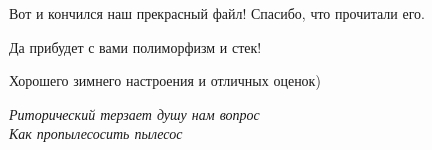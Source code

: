 {}


\newpage
{}



\newpage
\vspace*{250pt}
\noindent\makebox[\linewidth]{\rule{\paperwidth}{0.4pt}}
\vspace*{20pt}
{\begin{myquote2}
\begin{center}
    \bf \begin{small}{
    Вот и кончился наш прекрасный файл! Спасибо, что прочитали его.

    Да прибудет с вами полиморфизм и стек!

    Хорошего зимнего настроения и отличных оценок)

}\end{small}\end{center}
\begin{flushright}
    \textit{Риторический терзает душу нам вопрос\\
    Как пропылесосить пылесос}
    \end{flushright}
\end{myquote2}}

\vspace*{20pt}
\noindent\makebox[\linewidth]{\rule{\paperwidth}{0.4pt}}
\vspace*{20pt}
\newpage
\let\clearpage\relax





